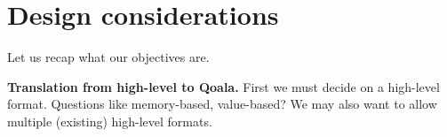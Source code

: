 




\section{Design considerations}
Let us recap what our objectives are.

\textbf{Translation from high-level to Qoala.}
First we must decide on a high-level format.
Questions like memory-based, value-based?
We may also want to allow multiple (existing) high-level formats.

